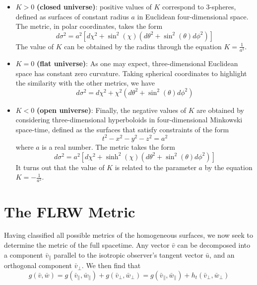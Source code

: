 \documentclass[12pt,letterpaper]{article}         %
\begin{document}
\begin{itemize}
    \item $K>0$ \textbf{(closed universe)}: positive values of $K$ correspond to 3-spheres, 
    defined as surfaces of constant radius $a$ in Euclidean four-dimensional space. The metric, in polar coordinates, takes the form
    \[
        d \sigma^2 = {a^2}[d\chi^2 + \sin^2(\chi)(d\theta^2 + \sin^2 (\theta)d\phi^2)]
    \]
    The value of $K$ can be obtained by the radius through the equation $K = \frac{1}{a^2}$.
    \item $K = 0$ \textbf{(flat universe)}: As one may expect, three-dimensional Euclidean space has constant zero curvature. Taking spherical coordinates to highlight the similarity with the other metrics, we have 
    \[
        d \sigma^2 = d\chi^2 + \chi^2(d\theta^2 + \sin^2(\theta) d\phi^2)
    \]
    \item $K<0$ \textbf{(open universe)}: Finally, the negative values of $K$ are obtained by considering three-dimensional hyperboloids in four-dimensional Minkowski space-time, defined as the surfaces that satisfy constraints of the form
    \[
        t^2 - x^2 - y^2 - z^2 = a^2
    \]
    where $a$ is a real number. The metric takes the form
    \[
    d \sigma^2 = {a^2}[d\chi^2 + \sinh^2(\chi)(d\theta^2 + \sin^2(\theta) d\phi^2)]
    \]
    It turns out that the value of $K$ is related to the parameter $a$ by the equation $K = -\frac{1}{a^2}$.
\end{itemize}


\section{The FLRW Metric}

Having classified all possible metrics of the homogeneous surfaces, we now seek to determine the metric of the full spacetime. Any vector $\bar{v}$ can be decomposed into a component $\bar{v}_\parallel$ parallel to the isotropic observer's tangent  vector $\bar{u}$, and an orthogonal component $\bar{v}_\perp$. We then find that 
\begin{equation}
    g(\bar{v}, \bar{w}) = g(\bar{v}_{\parallel}, \bar{w}_{\parallel}) + g(\bar{v}_\perp, \bar{w}_\perp) = g(\bar{v}_{\parallel}, \bar{w}_{\parallel}) + h_t(\bar{v}_\perp, \bar{w}_\perp)
\label{metric_decomposition}
\end{equation}
\end{document}
